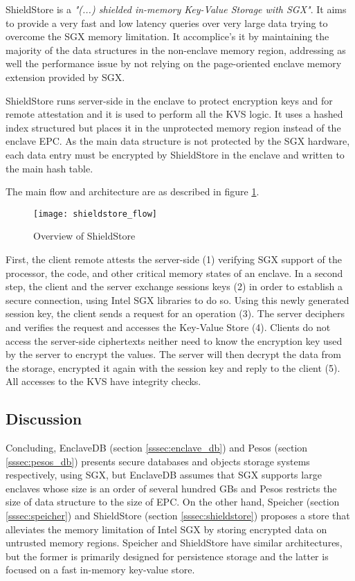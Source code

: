 ShieldStore \cite{shieldstore:1} is a \textit{"(...) shielded in-memory Key-Value Storage with \gls{SGX}"}. It aims to provide a very fast and low latency queries over very large data trying to overcome the \gls{SGX} memory limitation. It accomplice's it by maintaining the majority of the data structures in the non-enclave memory region, addressing as well the performance issue by not relying on the page-oriented enclave memory extension provided by \gls{SGX}.

ShieldStore runs server-side in the enclave to protect encryption keys and for remote attestation and it is used to perform all the \gls{KVS} logic. It uses a hashed index structured but places it in the unprotected memory region instead of the enclave \gls{EPC}. As the main data structure is not protected by the \gls{SGX} hardware, each data entry must be encrypted by ShieldStore in the enclave and written to the main hash table.

The main flow and architecture are as described in figure \ref{fig:shieldstore_overview}.

\begin{figure}[htbp]
	\centering
	{\texttt{[image: shieldstore\_flow]}}%
	\caption{Overview of ShieldStore}
	\label{fig:shieldstore_overview}
\end{figure}

First, the client remote attests the server-side (1) verifying \gls{SGX} support of the processor, the code, and other critical memory states of an enclave. In a second step, the client and the server exchange sessions keys (2) in order to establish a secure connection, using Intel \gls{SGX} libraries to do so. Using this newly generated session key, the client sends a request for an operation (3). The server deciphers and verifies the request and accesses the Key-Value Store (4). Clients do not access the server-side ciphertexts neither need to know the encryption key used by the server to encrypt the values. The server will then decrypt the data from the storage, encrypted it again with the session key and reply to the client (5). All accesses to the \gls{KVS} have integrity checks.

\subsection{Discussion}
\label{ssec:s3_discussion}

Concluding, EnclaveDB (section \ref{sssec:enclave_db}) and Pesos (section \ref{sssec:pesos_db}) presents secure databases and objects storage systems respectively, using \gls{SGX}, but EnclaveDB assumes that \gls{SGX} supports large enclaves whose size is an order of several hundred \glspl{GB} and Pesos restricts the size of data structure to the size of \gls{EPC}. On the other hand, Speicher (section \ref{sssec:speicher}) and ShieldStore (section \ref{sssec:shieldstore}) proposes a store that alleviates the memory limitation of Intel \gls{SGX} by storing encrypted data on untrusted memory regions. Speicher and ShieldStore have similar architectures, but the former is primarily designed for persistence storage and the latter is focused on a fast in-memory key-value store.

